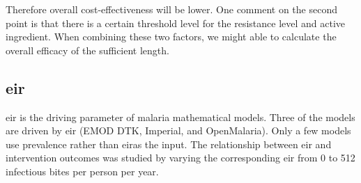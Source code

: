 \documentclass[a4paper, 12pt, twoside]{report}
\begin{document}

Therefore overall cost-effectiveness will be lower.  
One comment on the second point is that there is a certain threshold level for the resistance level and active ingredient.
When combining these two factors, we might able to calculate the overall efficacy of the sufficient length.

%
%




\subsection{\texorpdfstring{\gls{eir}}{EIR}}%
\label{sub:eir}
\gls{eir} is the driving parameter of malaria mathematical models.
Three of the models are driven by \gls{eir} (EMOD DTK, Imperial, and OpenMalaria).
Only a few models use prevalence rather than \gls{eir}as the input.
The relationship between \gls{eir} and intervention outcomes was studied by varying the corresponding \gls{eir} from 0 to 512 infectious bites per person per year.
\end{document}
